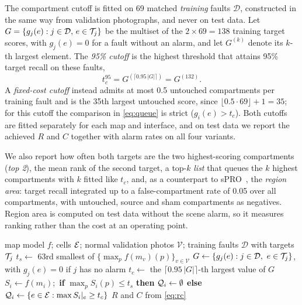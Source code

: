 The compartment cutoff is fitted on 69 matched \emph{training} faults $\mathcal{D}$, constructed in the same way from validation photographs, and never on test data. Let $G=\{g_j(e): j\in\mathcal{D},\,e\in\mathcal{T}_j\}$ be the multiset of the $2\times69=138$ training target scores, with $g_j(e)=0$ for a fault without an alarm, and let $G^{(k)}$ denote its $k$-th largest element. The \emph{95\% cutoff} is the highest threshold that attains 95\% target recall on these faults,
\begin{equation}
 t_c^{95}=G^{(\lceil 0.95\,|G|\rceil)}=G^{(132)}.
 \label{eq:tc}
\end{equation} A \emph{fixed-cost cutoff} instead admits at most 0.5 untouched compartments per training fault and is the 35th largest untouched score, since $\lfloor0.5\cdot69\rfloor+1=35$; for this cutoff the comparison in \cref{eq:queue} is strict ($g_i(e)>t_c$). Both cutoffs are fitted separately for each map and interface, and on test data we report the achieved $R$ and $C$ together with alarm rates on all four variants.

We also report how often both targets are the two highest-scoring compartments (\emph{top 2}), the mean rank of the second target, a top-$k$ \emph{list} that queues the $k$ highest compartments with $k$ fitted like $t_c$, and, as a counterpart to sPRO~\cite{bergmann2022}, the \emph{region area}: target recall integrated up to a false-compartment rate of 0.05 over all compartments, with untouched, source and sham compartments as negatives. Region area is computed on test data without the scene alarm, so it measures ranking rather than the cost at an operating point.

\begin{algorithm}[t]
\caption{Calibrated inspection queue}
\label{alg:queue}
\begin{algorithmic}[1]
\Require map model $f$; cells $\mathcal{E}$; normal validation photos $\mathcal{V}$; training faults $\mathcal{D}$ with targets $\mathcal{T}_j$
\State $t_s\gets$ 63rd smallest of $\{\max_p f(m_v)(p)\}_{v\in\mathcal{V}}$ 
\State $G\gets\{g_j(e): j\in\mathcal{D},\ e\in\T_j\}$, with $g_j(e)=0$ if $j$ has no alarm
\State $t_c\gets$ the $\lceil 0.95\,|G|\rceil$-th largest value of $G$ 
  \State $S_i\gets f(m_i)$;\ \textbf{if} $\max_p S_i(p)\le t_s$ \textbf{then} $\mathcal{Q}_i\gets\emptyset$
  \State \textbf{else} $\mathcal{Q}_i\gets\{e\in\mathcal{E}: \max S_i|_e\ge t_c\}$
\EndFor
\State \Return $R$ and $C$ from \cref{eq:rc}
\end{algorithmic}
\end{algorithm}

